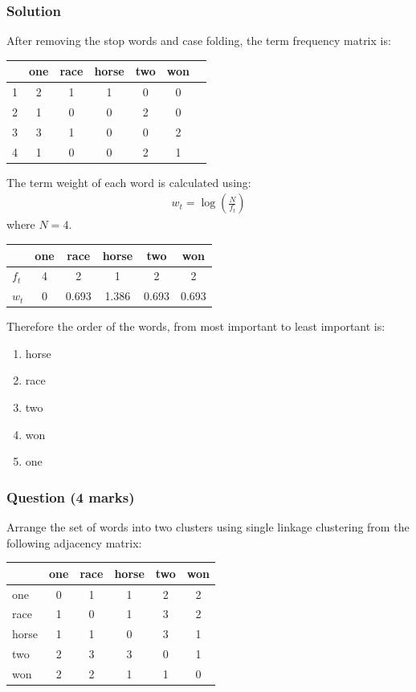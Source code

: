 \documentclass{uws_learning_guide}
\begin{document}
\subsubsection*{Solution}

After removing the stop words and case folding, the term frequency matrix is:
\begin{center}
\begin{tabular}{lcccccc}
\toprule
  & one & race & horse & two & won \\
\midrule
1 & 2 & 1 & 1 & 0 & 0 \\
2 & 1 & 0 & 0 & 2 & 0 \\
3 & 3 & 1 & 0 & 0 & 2 \\
4 & 1 & 0 & 0 & 2 & 1 \\
\bottomrule
\end{tabular}
\end{center}
The term weight of each word is calculated using:
\begin{align*}
  w_t = \log{\left (\frac{N}{f_t}\right )}
\end{align*}
where $N = 4$.
\begin{center}
\begin{tabular}{lccccc}
\toprule
  & one & race & horse & two & won \\
\midrule
$f_t$ & 4 & 2 & 1 & 2 & 2 \\
$w_t$ & 0 & 0.693 & 1.386 & 0.693 & 0.693 \\
\bottomrule
\end{tabular}
\end{center}
Therefore the order of the words, from most important to least important is:
\begin{enumerate}
\item horse
\item race 
\item two 
\item won 
\item one
\end{enumerate}


\subsubsection*{Question (4 marks)}

Arrange the set of words into two clusters using single linkage clustering from the following adjacency matrix:
\begin{center}
\begin{tabular}{lccccc}
\toprule
  & one & race & horse & two & won \\
\midrule
one   & 0 & 1 & 1 & 2 & 2 \\
race  & 1 & 0 & 1 & 3 & 2 \\
horse & 1 & 1 & 0 & 3 & 1 \\
two   & 2 & 3 & 3 & 0 & 1 \\
won   & 2 & 2 & 1 & 1 & 0 \\
\bottomrule
\end{tabular}
\end{center}
\end{document}
